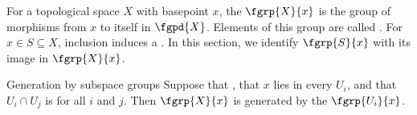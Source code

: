 For a topological space $X$ with basepoint $x$, the
 $\fgrp{X}{x}$ is the group
of morphisms from $x$ to itself in $\fgpd{X}$.  Elements of this group are called
.
For $x\in S\subseteq X$, inclusion induces a
.
In this section, we identify $\fgrp{S}{x}$ with its image in $\fgrp{X}{x}$.

\begin{theorem}[id=3.1]{Generation by subspace groups}
Suppose that \hypCoverFamily, that $x$ lies in every $U_i$, and that
$U_{i} \cap U_{j}$ is  for all $i$ and $j$.
Then $\fgrp{X}{x}$ is generated by the $\fgrp{U_i}{x}$.
\end{theorem}

